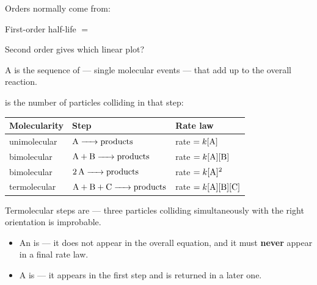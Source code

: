 \documentclass{apchem-notes}
\begin{document}
\begin{warmup}[3]
  \item Orders normally come from:
  \item First-order half-life $=$ 
  \item Second order gives which linear plot?
\end{warmup}



A  is the sequence of  --- single
molecular events --- that add up to the overall reaction.

\begin{center}
\end{center}

 is the number of particles colliding in that step:

\begin{center}
\begin{tabular}{@{}lll@{}}
\hline
\textbf{Molecularity} & \textbf{Step} & \textbf{Rate law} \\
\hline
unimolecular & $\ce{A -> products}$ & rate $= k[\ce{A}]$ \\
bimolecular & $\ce{A + B -> products}$ & rate $= k[\ce{A}][\ce{B}]$ \\
bimolecular & $\ce{2A -> products}$ & rate $= k[\ce{A}]^2$ \\
termolecular & $\ce{A + B + C -> products}$ & rate $= k[\ce{A}][\ce{B}][\ce{C}]$ \\
\hline
\end{tabular}
\end{center}

Termolecular steps are  --- three particles
colliding simultaneously with the right orientation is improbable.


\begin{itemize}[leftmargin=*,itemsep=0.3em]
  \item An  is
         --- it does not appear
        in the overall equation, and it must \textbf{never} appear in a
        final rate law.
  \item A  is 
        --- it appears in the first step and is returned in a later one.
\end{itemize}
\end{document}

